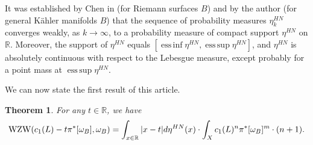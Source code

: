 \documentclass[12pt]{article}
\numberwithin{equation}{section}
\theoremstyle{theorem}
\newtheorem{thm}{Theorem}[section]
\theoremstyle{definition}
\theoremstyle{remark}
\newcommand{\real}{\mathbb{R}}
\DeclareMathOperator*{\esssup}{ess\,sup}
\DeclareMathOperator*{\essinf}{ess\,inf}
\begin{document}

	\par 
	It was established by Chen in \cite[Theorem 4.3.6]{ChenHNolyg} (for Riemann surfaces $B$) and by the author \cite[Theorem 1.5]{FinHNII} (for general Kähler manifolds $B$) that the sequence of probability measures $\eta_k^{HN}$ converges weakly, as $k \to \infty$, to a probability measure of compact support $\eta^{HN}$ on $\real$. 
	Moreover, the support of $\eta^{HN}$ equals $[\essinf \eta^{HN}, \esssup \eta^{HN}]$, and $\eta^{HN}$ is absolutely continuous with respect to the Lebesgue measure, except probably for a point mass at $\esssup \eta^{HN}$.
	\par 
	We can now state the first result of this article.
	\begin{thm}\label{thm_main}
		For any $t \in \real$, we have
		\begin{equation}\label{eq_main}
			{\rm{WZW}}(c_1(L) - t \pi^* [\omega_B], \omega_B) 
			= 
			\int_{x \in \real} |x - t| d \eta^{HN}(x)
			\cdot
			\int_X c_1(L)^n \pi^* [\omega_B]^m
			\cdot
			(n + 1).
		\end{equation}
	\end{thm}
\end{document}
